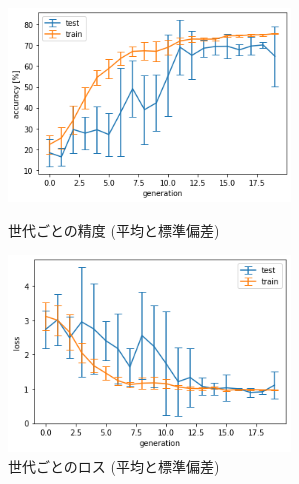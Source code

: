 \documentclass[twocolumn]{jarticle}     %
\begin{document}
\begin{figure}[tb]
 \begin{minipage}{0.5\hsize}
 	\begin{center}
 		\includegraphics[clip,width=75mm]{acc.png}
 		\caption{世代ごとの精度 (平均と標準偏差)}
 		\label{fig:acc}
 	\end{center}
 \end{minipage}
 \begin{minipage}{0.5\hsize}
 	\begin{center}
 		\includegraphics[clip,width=75mm]{loss.png}
 		\caption{世代ごとのロス (平均と標準偏差)}
 		\label{fig:loss}
 	\end{center}
 \end{minipage}
\end{figure}
\end{document}
